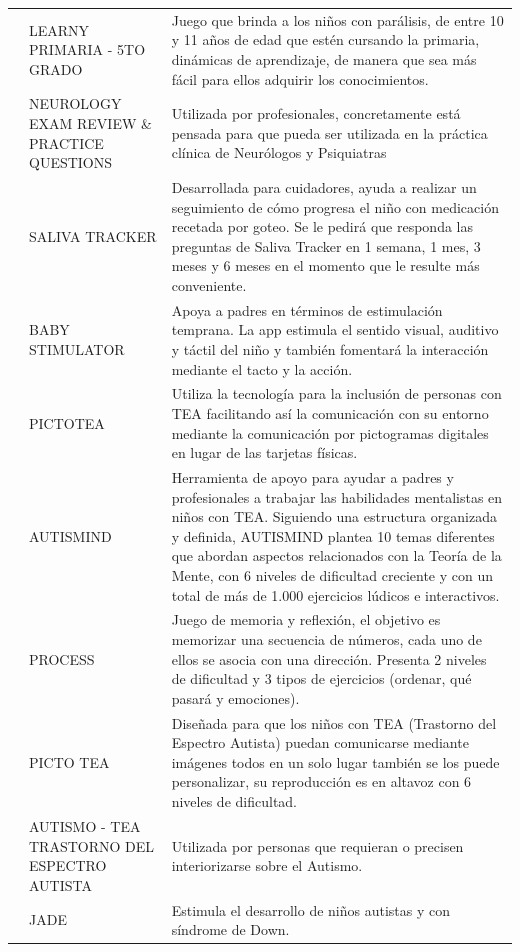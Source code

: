 \documentclass[spanish]{textolivre}
\begin{document}
\begin{small}
\begin{longtable}{
    p{}
    p{}    
    p{}    }
 & LEARNY PRIMARIA - 5TO GRADO & Juego que brinda a los niños con parálisis, de entre 10 y 11 años de edad que estén cursando la primaria, dinámicas de aprendizaje, de manera que sea más fácil para ellos adquirir los conocimientos. \\
 & NEUROLOGY EXAM REVIEW \& PRACTICE QUESTIONS & Utilizada por profesionales, concretamente está pensada para que pueda ser utilizada en la práctica clínica de Neurólogos y Psiquiatras \\
 & SALIVA TRACKER & Desarrollada para cuidadores, ayuda a realizar un seguimiento de cómo progresa el niño con medicación recetada por goteo. Se le pedirá que responda las preguntas de Saliva Tracker en 1 semana, 1 mes, 3 meses y 6 meses en el momento que le resulte más conveniente. \\
 & BABY STIMULATOR & Apoya a padres en términos de estimulación temprana. La app estimula el sentido visual, auditivo y táctil del niño y también fomentará la interacción mediante el tacto y la acción. \\
\midrule
\parbox[t]{2mm}{}
 & PICTOTEA & Utiliza la tecnología para la inclusión de personas con TEA facilitando así la comunicación con su entorno mediante la comunicación por pictogramas digitales en lugar de las tarjetas físicas. \\
 & AUTISMIND & Herramienta de apoyo para ayudar a padres y profesionales a trabajar las habilidades mentalistas en niños con TEA. Siguiendo una estructura organizada y definida, AUTISMIND plantea 10 temas diferentes que abordan aspectos relacionados con la Teoría de la Mente, con 6 niveles de dificultad creciente y con un total de más de 1.000 ejercicios lúdicos e interactivos. \\
 & PROCESS & Juego de memoria y reflexión, el objetivo es memorizar una secuencia de números, cada uno de ellos se asocia con una dirección. Presenta 2 niveles de dificultad y 3 tipos de ejercicios (ordenar, qué pasará y emociones). \\
 & PICTO TEA & Diseñada para que los niños con TEA (Trastorno del Espectro Autista) puedan comunicarse mediante imágenes todos en un solo lugar también se los puede personalizar, su reproducción es en altavoz con 6 niveles de dificultad. \\
 & AUTISMO - TEA TRASTORNO DEL ESPECTRO AUTISTA & Utilizada por personas que requieran o precisen interiorizarse sobre el Autismo. \\
& JADE & Estimula el desarrollo de niños autistas y con síndrome de Down. \\

\end{longtable}
\end{small}
\end{document}
